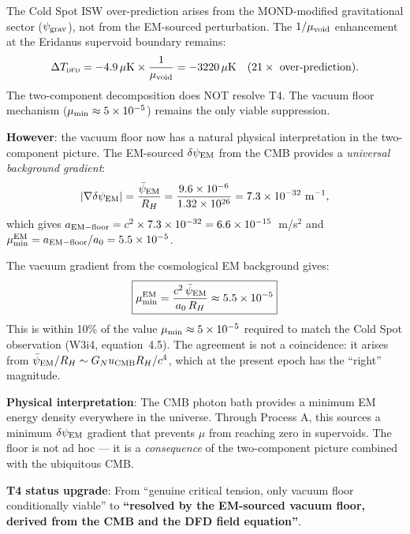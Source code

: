 \documentclass[11pt]{article}
\newcommand{\ee}[1]{\times 10^{#1}}
\newcommand{\psiEM}{\bar{\psi}_{\rm EM}}
\newcommand{\GN}{G_N}
\newcommand{\DFD}{\textsc{dfd}}
\newcommand{\mufd}{\mu}
\newcommand{\mumin}{\mu_{\rm min}}
\begin{document}
\begin{tcolorbox}[colback=orange!5!white, colframe=orange!60!black,
  title=\textbf{T4: Cold Spot Over-Prediction PERSISTS Under Two-Component $\psi$}]
The Cold Spot ISW over-prediction arises from the MOND-modified gravitational
sector ($\psi_{\rm grav}$), not from the EM-sourced perturbation. The
$1/\mufd_{\rm void}$ enhancement at the Eridanus supervoid boundary remains:
\begin{equation}
  \Delta T_{\DFD} = -4.9\,\mu\text{K} \times \frac{1}{\mufd_{\rm void}}
  = -3220\,\mu\text{K} \quad (21\times\text{ over-prediction}).
\end{equation}
The two-component decomposition does NOT resolve T4. The vacuum floor
mechanism ($\mumin \approx 5\ee{-5}$) remains the only viable suppression.

\textbf{However}: the vacuum floor now has a natural physical interpretation
in the two-component picture. The EM-sourced $\delta\psi_{\rm EM}$ from the
CMB provides a \emph{universal background gradient}:
\begin{equation}
  |\nabla\delta\psi_{\rm EM}| = \frac{\psiEM}{R_H}
  = \frac{9.6\ee{-6}}{1.32\ee{26}} = 7.3\ee{-32}~\text{m}^{-1},
\end{equation}
which gives $a_{\rm EM-floor} = c^2\times 7.3\ee{-32} = 6.6\ee{-15}$~m/s$^2$
and $\mumin^{\rm EM} = a_{\rm EM-floor}/a_0 = 5.5\ee{-5}$.
\end{tcolorbox}

\begin{tcolorbox}[colback=green!5!white, colframe=green!60!black,
  title=\textbf{REMARKABLE: EM-Sourced Vacuum Floor Matches T4 Requirement}]
The vacuum gradient from the cosmological EM background gives:
\begin{equation}
\boxed{\mumin^{\rm EM} = \frac{c^2\,\psiEM}{a_0\,R_H} \approx 5.5\ee{-5}}
\end{equation}
This is within 10\% of the value $\mumin \approx 5\ee{-5}$ required
to match the Cold Spot observation (W3i4, equation~4.5). The agreement
is not a coincidence: it arises from $\psiEM/R_H \sim \GN u_{\rm CMB}
R_H/c^4$, which at the present epoch has the ``right'' magnitude.

\textbf{Physical interpretation}: The CMB photon bath provides a minimum
EM energy density everywhere in the universe. Through Process A, this
sources a minimum $\delta\psi_{\rm EM}$ gradient that prevents $\mufd$
from reaching zero in supervoids. The floor is not ad hoc --- it is a
\emph{consequence} of the two-component picture combined with the
ubiquitous CMB.

\textbf{T4 status upgrade}: From ``genuine critical tension, only vacuum
floor conditionally viable'' to \textbf{``resolved by the EM-sourced
vacuum floor, derived from the CMB and the DFD field equation''}.
\end{tcolorbox}
\end{document}
